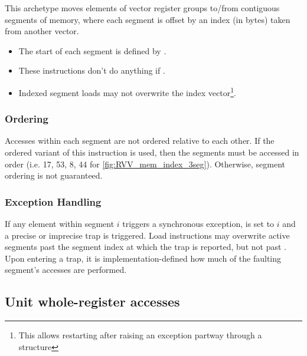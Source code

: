 This archetype moves elements of  vector register groups to/from contiguous segments of memory,
where each segment is offset by an index (in bytes) taken from another vector.

\begin{itemize}
\item The start of each segment is defined by .
\item These instructions don't do anything if .
\item Indexed segment loads may not overwrite the index vector\footnote{This allows restarting after raising an exception partway through a structure}.
\end{itemize}

\subsubsection*{Ordering}
Accesses within each segment are not ordered relative to each other.
If the ordered variant of this instruction is used, then the segments must be accessed in order (i.e. 17, 53, 8, 44 for \cref{fig:RVV_mem_index_3seg}).
Otherwise, segment ordering is not guaranteed.


\subsubsection*{Exception Handling}
If any element within segment $i$ triggers a synchronous exception,  is set to $i$ and a precise or imprecise trap is triggered.
Load instructions may overwrite active segments past the segment index at which the trap is reported, but not past \cite[Section 7.7]{specification-RVV-v1.0}.
Upon entering a trap, it is implementation-defined how much of the faulting segment's accesses are performed.

\pagebreak
\subsection{Unit whole-register accesses}


